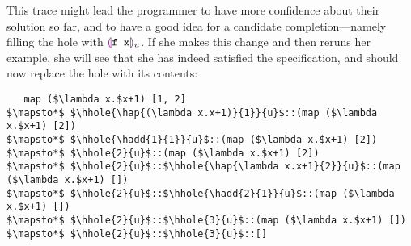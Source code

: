 This trace might lead the programmer to have more confidence about their
solution so far, and to have a good idea for a candidate
completion---namely filling the hole with $\textcolor{violet}{\llparenthesis}\texttt{f x}\textcolor{violet}{\rrparenthesis}_{u}$. If she
makes this change and then reruns her example, she will see that she has
indeed satisfied the specification, and should now replace the hole with
its contents:
\begin{lstlisting}
   map ($\lambda x.$x+1) [1, 2]
$\mapsto*$ $\hhole{\hap{(\lambda x.x+1)}{1}}{u}$::(map ($\lambda x.$x+1) [2])
$\mapsto*$ $\hhole{\hadd{1}{1}}{u}$::(map ($\lambda x.$x+1) [2])
$\mapsto*$ $\hhole{2}{u}$::(map ($\lambda x.$x+1) [2])
$\mapsto*$ $\hhole{2}{u}$::$\hhole{\hap{\lambda x.x+1}{2}}{u}$::(map ($\lambda x.$x+1) [])
$\mapsto*$ $\hhole{2}{u}$::$\hhole{\hadd{2}{1}}{u}$::(map ($\lambda x.$x+1) [])
$\mapsto*$ $\hhole{2}{u}$::$\hhole{3}{u}$::(map ($\lambda x.$x+1) [])
$\mapsto*$ $\hhole{2}{u}$::$\hhole{3}{u}$::[]
\end{lstlisting}

